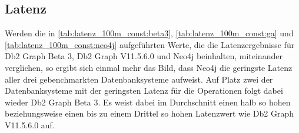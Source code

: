 \subsection{Latenz}
Werden die in \autoref{tab:latenz_100m_const:beta3}, \autoref{tab:latenz_100m_const:ga} und \autoref{tab:latenz_100m_const:neo4j} aufgeführten Werte, die die Latenzergebnisse für Db2 Graph Beta 3, Db2 Graph V11.5.6.0 und Neo4j beinhalten, miteinander verglichen, so ergibt sich einmal mehr das Bild, dass Neo4j die geringste Latenz aller drei gebenchmarkten Datenbanksysteme aufweist. Auf Platz zwei der Datenbanksysteme mit der geringsten Latenz für die Operationen folgt dabei wieder Db2 Graph Beta 3. Es weist dabei im Durchschnitt einen halb so hohen beziehungsweise einen bis zu einem Drittel so hohen Latenzwert wie Db2 Graph V11.5.6.0 auf.

\begin{table}[!ht]
\centering
{}
\caption{Latenz Linkbench-Const-100M Db2 Graph Beta 3}
\label{tab:latenz_100m_const:beta3}
\end{table}

